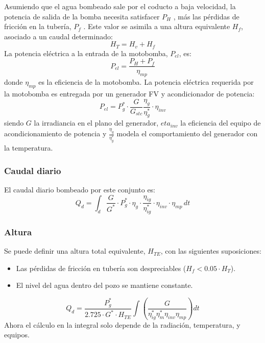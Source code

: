 Asumiendo que el agua bombeado sale por el coducto a baja velocidad, la potencia de salida de la bomba necesita satisfacer \(P_H\) , más las pérdidas de fricción en la tubería, \(P_f\) . Este valor se asimila a una altura equivalente \(H_f\),  asociado a un caudal determinado: 
\begin{equation}
H_T=H_v+H_f
\end{equation}
La potencia eléctrica a la entrada de la motobomba, \(P_{el}\), es:
\begin{equation}
P_{el}=\frac{P_H+P_f}{\eta_{mp}} 
\end{equation}
donde \(\eta_{mp}\) es la eficiencia de la motobomba.
La potencia eléctrica requerida por la motobomba es entregada por un generador FV y acondicionador de potencia:
\begin{equation}
P_{el}=P_g^* \cdot \frac{G}{G_{stc}} \frac{\eta_g}{\eta_g^*} \cdot \eta_{inv}
\end{equation}
siendo \(G\) la irradiancia en el plano del generador, \(eta_{inv}\) la eficiencia del equipo de acondicionamiento de potencia y \(\frac{\eta_g}{\eta_g^*}\) modela el comportamiento del generador con la temperatura.

\subsubsection{Caudal diario}
\label{sec:org19776f0}
El caudal diario bombeado por este conjunto es:
\begin{equation}
Q_d = \int_{d} \frac{G}{G^*} \cdot P_g^* \cdot \eta_g \cdot \frac{\eta_{ig}}{\eta_{ig}^*} \cdot \eta_{inv} \cdot \eta_{mp} \, dt
\end{equation}

\subsubsection{Altura}
\label{sec:org56613b0}
Se puede definir una altura total equivalente, \(H_{TE}\), con las siguientes suposiciones:
\begin{itemize}
\item Las pérdidas de fricción en tubería son despreciables (\(H_f < 0.05 \cdot H_T\)).
\item El nivel del agua dentro del pozo se mantiene constante.
\end{itemize}
\begin{equation}
Q_d = \frac{P^*_g}{2.725 \cdot G^* \cdot H_{TE}} \int \left( \frac{G}{\eta_{ig}^{*} \eta_{m}^{*} \eta_{inv} \eta_{mp}} \right) dt
\end{equation}
Ahora el cálculo en la integral solo depende de la radiación, temperatura, y equipos.

